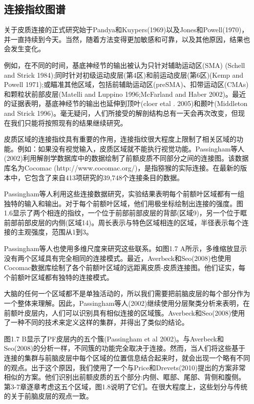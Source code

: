 \subsection{连接指纹图谱}
关于皮质连接的正式研究始于Pandya和Kuypers(1969)以及Jones和Powell(1970)，并一直持续到今天。当然，随着方法变得更加敏感和可靠，以及其他原因，结果也会发生变化。
\par
例如，在不同的时间，基底神经节的输出被认为只针对辅助运动区(SMA) (Schell and Strick 1984);同时针对初级运动皮层(第4区)和前运动皮层(第6区)(Kemp and Powell 1971);或瞄准其他区域，包括前辅助运动区(preSMA)、扣带运动区(CMAs)和颗粒状前部皮层(Matelli and Luppino 1996;McFarland and Haber 2002)。最近的证据表明，基底神经节的输出也延伸到顶叶(cloer etal . 2005)和颞叶(Middleton and Strick 1996)。毫无疑问，人们所接受的解剖结构总有一天会再次改变，但现在我们只能将按照现有的结果继续研究。
\par
皮质区域的连接指纹具有重要的作用，连接指纹很大程度上限制了相关区域的功能。例如：如果没有视觉输入，皮质区域就不能执行视觉功能。Passingham等人(2002)利用解剖学数据库中的数据绘制了前额皮质不同部分之间的连接图。该数据库名为Cocomac (http://www.cocomac.org/)，是指猕猴的实际连接。在最新的版本中，它包含了来自413项研究的39,748个连接条目的数据。
\par
Passingham等人利用这些连接数据研究，实验结果表明每个前额叶区域都有一组独特的输入和输出。对于每个前额叶区域，他们用极坐标绘制出连接的强度。图1.6显示了两个相连的指纹，一个位于前部前部皮层的背部(区域9)，另一个位于眶前部前部皮层的内侧(区域14)。周长表示与特色区域相连的区域，半径表示每个连接的主观强度，范围从1到3。

\par
Passingham等人也使用多维尺度来研究这些联系。如图1.7 A所示，多维缩放显示没有两个区域具有完全相同的连接模式。最近，Averbeck和Seo(2008)也使用Cocomac数据库绘制了各个前额叶区域的远距离皮质-皮质连接图。他们证实，每个前额叶区域都有独特的连接模式。

\par
大脑的任何一个区域都不是单独活动的，所以我们需要把前脑皮层的每个部分作为一个整体来理解。因此，Passingham等人(2002)继续使用分层聚类分析来表明，在前额叶皮层内，人们可以识别具有相似连接的区域簇。Averbeck和Seo(2008)使用了一种不同的技术来定义这样的集群，并得出了类似的结论。

\par
图1.7 B显示了PF皮层内的五个簇(Passingham et al 2002)。与Averbeck和Seo(2008)的分析一样，不同簇的功能完全取决于连接。然而，当人们将这些基于连接的集群与前脑皮层中每个区域的位置信息结合起来时，就会出现一个略有不同的观点。出于这个原因，我们使用了一个与Price和Drevets(2010)提出的方案非常相似的方案。他们识别出前额皮质的五个部分:内侧、眶部、尾部、背侧和腹侧。第3-7章逐章考虑这五个区域，图1.8说明了它们。在很大程度上，这些划分与传统的关于前脑皮层的观点一致。

